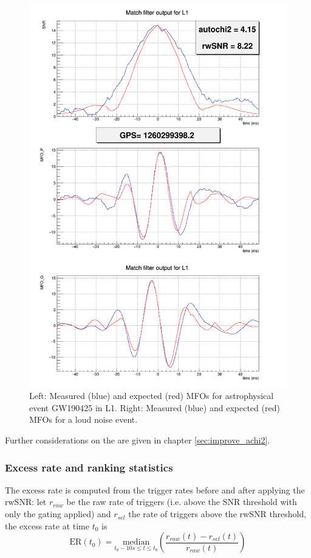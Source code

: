 \begin{figure}[ht]
\begin{minipage}{0.45\linewidth}
    \includegraphics[width=\linewidth]{sectionMBTA/mfoGlitch.png}
  \end{minipage}
  \caption{Left: Measured (blue) and expected (red) MFOs for astrophysical event GW190425 in L1. Right: Measured (blue) and expected (red) MFOs for a loud noise event.}
  \label{fig:mfo_achi2}
\end{figure}
%

Further considerations on the \achi are given in chapter \ref{sec:improve_achi2}.


\subsubsection{Excess rate and ranking statistics}
\label{sec:er}
The excess rate is computed from the trigger rates before and after applying the rwSNR: let $r_{raw}$ be the raw rate of triggers (i.e. above the SNR threshold with only the gating applied) and $r_{sel}$ the rate of triggers above the rwSNR threshold, the excess rate at time $t_0$ is
%
\begin{equation}
\label{eq:ER}
    \textrm{ER}(t_0) = \underset{t_0-10s \leq t \leq t_0}{\textrm{median}}\left( \frac{r_{raw}(t) - r_{sel}(t)}{r_{raw}(t)} \right)
\end{equation}
%

